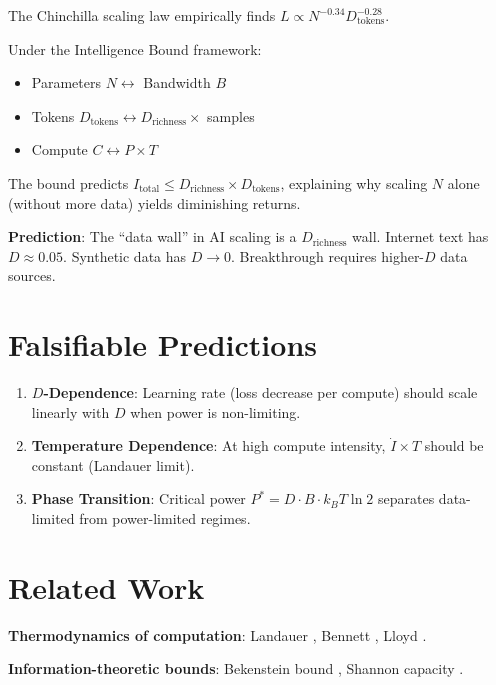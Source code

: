 \documentclass{article}
\begin{document}
The Chinchilla scaling law \cite{hoffmann2022} empirically finds $L \propto N^{-0.34} D_{\text{tokens}}^{-0.28}$.

Under the Intelligence Bound framework:
\begin{itemize}
    \item Parameters $N \leftrightarrow$ Bandwidth $B$
    \item Tokens $D_{\text{tokens}} \leftrightarrow D_{\text{richness}} \times$ samples
    \item Compute $C \leftrightarrow P \times T$
\end{itemize}

The bound predicts $I_{\text{total}} \leq D_{\text{richness}} \times D_{\text{tokens}}$, explaining why scaling $N$ alone (without more data) yields diminishing returns.

\textbf{Prediction}: The ``data wall'' in AI scaling is a $D_{\text{richness}}$ wall. Internet text has $D \approx 0.05$. Synthetic data has $D \to 0$. Breakthrough requires higher-$D$ data sources.

\section{Falsifiable Predictions}

\begin{enumerate}
    \item \textbf{$D$-Dependence}: Learning rate (loss decrease per compute) should scale linearly with $D$ when power is non-limiting.

    \item \textbf{Temperature Dependence}: At high compute intensity, $\dot{I} \times T$ should be constant (Landauer limit).

    \item \textbf{Phase Transition}: Critical power $P^* = D \cdot B \cdot k_B T \ln 2$ separates data-limited from power-limited regimes.
\end{enumerate}

\section{Related Work}

\textbf{Thermodynamics of computation}: Landauer \cite{landauer1961}, Bennett \cite{bennett1973}, Lloyd \cite{lloyd2000}.

\textbf{Information-theoretic bounds}: Bekenstein bound \cite{bekenstein1981}, Shannon capacity \cite{shannon1948}.
\end{document}
